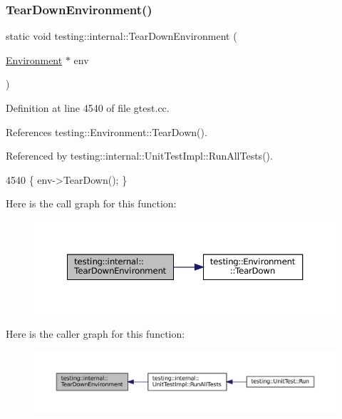 \subsubsection{\texorpdfstring{Tear\+Down\+Environment()}{TearDownEnvironment()}}
{\footnotesize\ttfamily static void testing\+::internal\+::\+Tear\+Down\+Environment (\begin{DoxyParamCaption}\item[{\hyperlink{classtesting_1_1Environment}{Environment} $\ast$}]{env }\end{DoxyParamCaption})\hspace{0.3cm}{\ttfamily [static]}}



Definition at line 4540 of file gtest.\+cc.



References testing\+::\+Environment\+::\+Tear\+Down().



Referenced by testing\+::internal\+::\+Unit\+Test\+Impl\+::\+Run\+All\+Tests().


\begin{DoxyCode}
4540 \{ env->TearDown(); \}
\end{DoxyCode}
Here is the call graph for this function\+:
\nopagebreak
\begin{figure}[H]
\begin{center}
\leavevmode
\includegraphics[width=350pt]{namespacetesting_1_1internal_ac467e871e4781da3f5ebed2a4465aec4_cgraph}
\end{center}
\end{figure}
Here is the caller graph for this function\+:
\nopagebreak
\begin{figure}[H]
\begin{center}
\leavevmode
\includegraphics[width=350pt]{namespacetesting_1_1internal_ac467e871e4781da3f5ebed2a4465aec4_icgraph}
\end{center}
\end{figure}
\mbox{\label{namespacetesting_1_1internal_a59a959f437bd7d515b5c41dcf00229c9}} 
